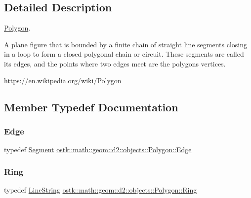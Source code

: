 \subsection{Detailed Description}
\hyperlink{classostk_1_1math_1_1geom_1_1d2_1_1objects_1_1_polygon}{Polygon}. 

A plane figure that is bounded by a finite chain of straight line segments closing in a loop to form a closed polygonal chain or circuit. These segments are called its edges, and the points where two edges meet are the polygon\textquotesingle{}s vertices.

https\+://en.wikipedia.\+org/wiki/\+Polygon 

\subsection{Member Typedef Documentation}
\mbox{\label{classostk_1_1math_1_1geom_1_1d2_1_1objects_1_1_polygon_a85e5c92944c126a62464874b5a6ba490}} 
\subsubsection{\texorpdfstring{Edge}{Edge}}
{\footnotesize\ttfamily typedef \hyperlink{classostk_1_1math_1_1geom_1_1d2_1_1objects_1_1_segment}{Segment} \hyperlink{classostk_1_1math_1_1geom_1_1d2_1_1objects_1_1_polygon_a85e5c92944c126a62464874b5a6ba490}{ostk\+::math\+::geom\+::d2\+::objects\+::\+Polygon\+::\+Edge}}

\mbox{\label{classostk_1_1math_1_1geom_1_1d2_1_1objects_1_1_polygon_a2cfc117e0bd669946a670640eae4ee4c}} 
\subsubsection{\texorpdfstring{Ring}{Ring}}
{\footnotesize\ttfamily typedef \hyperlink{classostk_1_1math_1_1geom_1_1d2_1_1objects_1_1_line_string}{Line\+String} \hyperlink{classostk_1_1math_1_1geom_1_1d2_1_1objects_1_1_polygon_a2cfc117e0bd669946a670640eae4ee4c}{ostk\+::math\+::geom\+::d2\+::objects\+::\+Polygon\+::\+Ring}}


